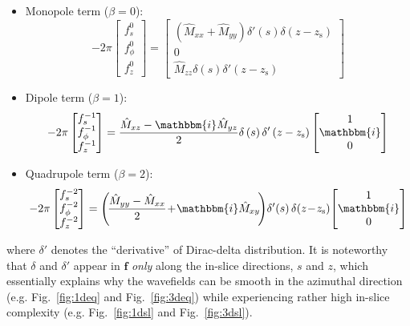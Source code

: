 \documentclass[extra,referee]{gji}
\begin{document}
\begin{itemize}
  \item Monopole term ($\beta=0$):
  \begin{equation} 
    -2\pi 
    \begin{bmatrix}
      f_s^0\\f_\phi^0\\f_z^0
    \end{bmatrix}
    =
    \begin{bmatrix}
      \left(\hat{M}_{xx}+\hat{M}_{yy}\right)\delta'\left(s\right)\delta\left(z-z_\text{s}\right)\\
      0\\
      \hat{M}_{zz}\delta\left(s\right)\delta'\left(z-z_\text{s}\right)
    \end{bmatrix}
    \label{eq:fmono}
  \end{equation}
  \item Dipole term ($\beta=1$):
  \begin{equation} 
    -2\pi 
    \begin{bmatrix}
      f_s^{-1}\\f_\phi^{-1}\\f_z^{-1}
    \end{bmatrix}
    =
    \frac{\hat{M}_{xz}-\mathbbm{i}\hat{M}_{yz}}{2}
    \delta\left(s\right)\delta'\left(z-z_\text{s}\right)
    \begin{bmatrix}
      1\\\mathbbm{i}\\0
    \end{bmatrix}
    \label{eq:fdi}
  \end{equation}
  \item Quadrupole term ($\beta=2$):
  \begin{equation} 
    -2\pi 
    \begin{bmatrix}
       f_s^{-2}\\f_\phi^{-2}\\f_z^{-2}
    \end{bmatrix}
    =
    \left(\!\frac{\hat{M}_{yy}-\hat{M}_{xx}}{2}\!+\!\mathbbm{i}\hat{M}_{xy}\!\right)
    \!\delta'\!\left(s\right) \delta\!\left(z\!-\!z_\text{s}\right)
    \!\begin{bmatrix}
      1\\\mathbbm{i}\\0
    \end{bmatrix}
    \label{eq:fquad}
  \end{equation}
\end{itemize}
where $\delta'$ denotes the ``derivative'' of Dirac-delta distribution. 
It is noteworthy that $\delta$ and $\delta'$ appear in $\mathbf{f}$ 
\textit{only} along the in-slice directions, $s$ and $z$, 
which essentially explains why the wavefields can be smooth in the 
azimuthal direction (e.g. Fig.~\ref{fig:1deq} and Fig.~\ref{fig:3deq})
while experiencing rather high in-slice complexity
(e.g. Fig.~\ref{fig:1dsl} and Fig.~\ref{fig:3dsl}). 
\end{document}
